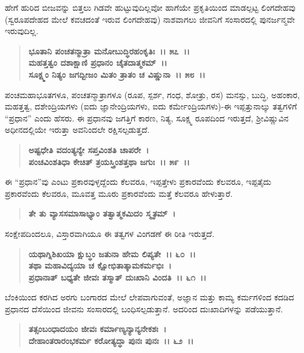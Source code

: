 ಹೇಗೆ ಹುರಿದ ಬೀಜವನ್ನು ಬಿತ್ತಲು ಗಿಡವೇ ಹುಟ್ಟುವುದಿಲ್ಲವೋ ಹಾಗೆಯೇ ಪ್ರಕೃತಿಯಿಂದ ಮಾಡಲ್ಪಟ್ಟ ಲಿಂಗದೇಹವು (ಸ್ವರೂಪದೇಹದ ಮೇಲೆ ಕವಚದಂತೆ ಇರುವ ಲಿಂಗದೇಹವು) ನಾಶವಾಗಲು ಜೀವನಿಗೆ ಸಂಸಾರದಲ್ಲಿ ಪುನರ್ಜನ್ಮವೇ ಇರುವುದಿಲ್ಲ.

\begin{verse}
\textbf{ಭೂತಾನಿ ಪಂಚತನ್ಮಾತ್ರಾ ಮನೋಬುದ್ಧಿರಹಂಕೃತಿಃ~।। ೫೭~।।}\\\textbf{ಮಹತ್ತತ್ವಂ ದಶಾಕ್ಷಾಣಿ ಪ್ರಧಾನಂ ಚೈತದಾತ್ಮಕಮ್~।। }\\\textbf{ಸೂಕ್ಷ್ಮಂ ನಿತ್ಯಂ ಜಗದ್ಬೀಜಂ ಮಿತಂ ತ್ರಾತಂ ಚ ವಿಷ್ಣುನಾ~।। ೫೮~।।}
\end{verse}

ಪಂಚಮಹಾಭೂತಗಳೂ, ಪಂಚತನ್ಮಾತ್ರಾಗಳೂ (ರೂಪ, ಸ್ಪರ್ಶ, ಗಂಧ, ಶೋತ್ರು, ರಸ) ಮನಸ್ಸು, ಬುದ್ಧಿ, ಅಹಂಕಾರ, ಮಹತ್ತತ್ವ, ದಶೇಂದ್ರಿಯಗಳು (ಐದು ಜ್ಞಾನೇಂದ್ರಿಯಗಳು, ಐದು ಕರ್ಮೇಂದ್ರಿಯಗಳು)-ಈ ಇಪ್ಪತ್ತುನಾಲ್ಕು ತತ್ವಗಳಿಗೆ “ಪ್ರಧಾನ” ಎಂದು ಹೆಸರು. ಈ ಪ್ರಧಾನವು ಜಗತ್ತಿಗೆ ಕಾರಣ, ನಿತ್ಯ, ಸೂಕ್ಷ್ಮ ರೂಪದಿಂದ ಇರುತ್ತದೆ, ಶ‍್ರೀವಿಷ್ಣುವಿನ ಅಧೀನದಲ್ಲಿಯೇ ಇರುತ್ತಾ ಅವನಿಂದಲೇ ರಕ್ಷಿಸಲ್ಪಡುತ್ತದೆ.

\begin{verse}
\textbf{ಅಷ್ಟಧೇತಿ ವದಂತ್ಯನ್ಯೇ ಸಪ್ತವಿಂಶತಿ ಚಾಪರೇ~।}\\\textbf{ಪಂಚವಿಂಶತಿಧಾ ಕೇಚಿತ್ ತ್ರಯಸ್ತ್ರಿಂಶತ್ತಥಾ ಜಗುಃ~।। ೫೯~।।}
\end{verse}

ಈ “ಪ್ರಧಾನ”ವು ಎಂಟು ಪ್ರಕಾರವುಳ್ಳದ್ದೆಂದು ಕೆಲವರೂ, ಇಪ್ಪತ್ತೇಳು ಪ್ರಕಾರವೆಂದು ಕೆಲವರೂ, ಇಪ್ಪತೈದು ಪ್ರಕಾರವೆಂದು ಕೆಲವರೂ, ಮೂವತ್ತ ಮೂರು ಪ್ರಕಾರವೆಂದು ಮತ್ತೆ ಕೆಲವರೂ ಹೇಳುತ್ತಾರೆ.

\begin{verse}
\textbf{ತೇ ತು ವ್ಯಾಸಸಮಾಸಾಭ್ಯಾಂ ತತ್ವಾತ್ಮಕಮಿದಂ ಸ್ಮೃತಮ್~।}
\end{verse}

ಸಂಕ್ಷೇಪದಿಂದಲೂ, ವಿಸ್ತಾರವಾಗಿಯೂ ಈ ತತ್ವಗಳ ವಿಂಗಡಣೆ ಈ ರೀತಿ ಇರುತ್ತದೆ.

\begin{verse}
\textbf{ಯಥಾಗ್ನಿಶಿಖಯಾ ಕ್ಷುಬ್ಧಂ ಜತುನಾ ಹೇಮ ಲಿಪ್ಯತೇ~।। ೬೦~।।}\\\textbf{ತಥಾ ಮಹಾವಿದ್ಯಯಾ ಚ ಕ್ಷೋಭಿತಾತ್ಕಾಮಕರ್ಮಭಿಃ~।}\\\textbf{ಪ್ರಧಾನಾತ್ ಬಧ್ಯತೇ ಜೀವಃ ತಸ್ಮಾತ್ ದುಃಖಾನಿ ವಿಂದತಿ~।। ೬೧~।।}
\end{verse}

ಬೆಂಕಿಯಿಂದ ಕರಗಿದ ಅರಗು ಬಂಗಾರದ ಮೇಲೆ ಲೇಪವಾಗುವಂತೆ, ಅಜ್ಞಾನ ಮತ್ತು ಕಾಮ್ಯ ಕರ್ಮಗಳಿಂದ ಕದಡಿದ ಪ್ರಧಾನದ ದೆಸೆಯಿಂದ ಜೀವನು ಸಂಸಾರದಲ್ಲಿ ಬಂಧಿಸಲ್ಪಡು\-ತ್ತಾನೆ. ಅದರಿಂದ ದುಃಖಾದಿಗಳನ್ನು ಪಡೆಯುತ್ತಾನೆ.

\begin{verse}
\textbf{ತತ್ಸಂಬಂಧಾದಯಂ ಜೀವಃ ಕರ್ಮಾಣ್ಯನ್ಯಾನ್ಯನೇಕಶಃ~।}\\\textbf{ದೇಹಾಂತರಾರಂಭಕರ್ಮ ಕರೋತ್ಯದ್ಧಾ ಪುನಃ ಪುನಃ~।। ೬೨~।।}
\end{verse}

